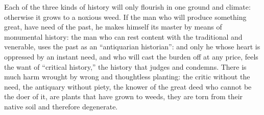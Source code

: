 Each of the three kinds of history will only flourish in one ground
and climate: otherwise it grows to a noxious weed. If the man who
will produce something great, have need of the past, he makes himself
its master by means of monumental history: the man who can rest
content with the traditional and venerable, uses the past as an
\enquote{antiquarian historian}: and only he whose heart is oppressed by an
instant need, and who will cast the burden off at any price, feels
the want of \enquote{critical history,} the history that judges and condemns.
There is much harm wrought by wrong and thoughtless planting: the
critic without the need, the antiquary without piety, the knower of
the great deed who cannot be the doer of it, are plants that have
grown to weeds, they are torn from their native soil and therefore
degenerate.
